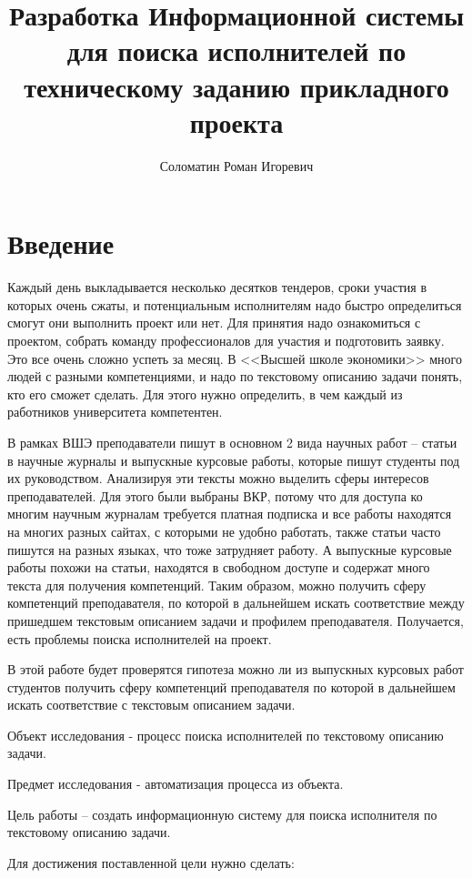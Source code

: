 \documentclass[PI,KR]{HSEUniversity}
\title{Разработка Информационной системы для поиска исполнителей по техническому заданию прикладного проекта}
\author{Соломатин Роман Игоревич}
\begin{document}
\maketitle

\chapter*{Введение}

Каждый день выкладывается несколько десятков тендеров, сроки участия в которых очень сжаты, и потенциальным исполнителям надо быстро определиться смогут они выполнить проект или нет. Для принятия надо ознакомиться с проектом, собрать команду профессионалов для участия и подготовить заявку. Это все очень сложно успеть за месяц. В <<Высшей школе экономики>> много людей с разными компетенциями, и надо по текстовому описанию задачи понять, кто его сможет сделать. Для этого нужно определить, в чем каждый из работников университета компетентен. 

В рамках ВШЭ преподаватели пишут в основном 2 вида научных работ -- статьи в научные журналы и выпускные курсовые работы, которые пишут студенты под их руководством. Анализируя эти тексты можно выделить сферы интересов преподавателей. Для этого были выбраны ВКР, потому что для доступа ко многим научным журналам требуется платная подписка и все работы находятся на многих разных сайтах, с которыми не удобно работать, также статьи часто пишутся на разных языках, что тоже затрудняет работу. А выпускные курсовые работы похожи на статьи, находятся в свободном доступе и содержат много текста для получения компетенций. Таким образом, можно получить сферу компетенций преподавателя, по которой в дальнейшем искать соответствие между пришедшем текстовым описанием задачи и профилем преподавателя. Получается, есть проблемы поиска исполнителей на проект. 

В этой работе будет проверятся гипотеза можно ли из выпускных курсовых работ студентов получить сферу компетенций преподавателя по которой в дальнейшем искать соответствие с текстовым описанием задачи.

Объект исследования - процесс поиска исполнителей по текстовому описанию задачи.

Предмет исследования - автоматизация процесса из объекта.

Цель работы – создать информационную систему для поиска исполнителя по текстовому описанию задачи.

Для достижения поставленной цели нужно сделать:
\end{document}
